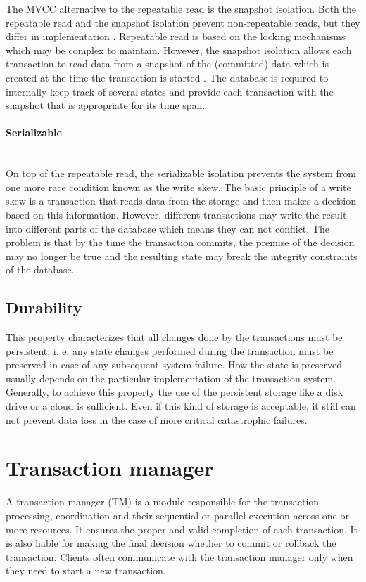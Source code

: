 \documentclass[oneside,
  digital, %
  table,   %
  nolof,     %
  nolot,     %
]{fithesis3}
\newcommand{\newlinepar}[1]{\paragraph{#1}\needspace{4\baselineskip}\mbox{}\\}
\begin{document}
The MVCC alternative to the repeatable read is the snapshot isolation. Both the repeatable read and the snapshot isolation prevent non-repeatable reads, but they differ in implementation \cite{isolation_levels}. Repeatable read is based on the locking mechanisms which may be complex to maintain. However, the snapshot isolation allows each transaction to read data from a snapshot of the (committed) data which is created at the time the transaction is started \cite{ansi-sql-critique}. The database is required to internally keep track of several states and provide each transaction with the snapshot that is appropriate for its time span.

\newlinepar{Serializable}

On top of the repeatable read, the serializable isolation prevents the system from one more race condition known as the write skew. The basic principle of a write skew is a transaction that reads data from the storage and then makes a decision based on this information. However, different transactions may write the result into different parts of the database which means they can not conflict. The problem is that by the time the transaction commits, the premise of the decision may no longer be true and the resulting state may break the integrity constraints of the database.

\subsection{Durability}

This property characterizes that all changes done by the transactions must be persistent, i. e. any state changes performed during the transaction must be preserved in case of any subsequent system failure. How the state is preserved usually depends on the particular implementation of the transaction system. Generally, to achieve this property the use of the persistent storage like a disk drive or a cloud is sufficient. Even if this kind of storage is acceptable, it still can not prevent data loss in the case of more critical catastrophic failures.


\section{Transaction manager}
\label{sec:transaction-manager}

A transaction manager (TM) is a module responsible for the transaction processing, coordination and their sequential or parallel execution across one or more resources. It ensures the proper and valid completion of each transaction. It is also liable for making the final decision whether to commit or rollback the transaction. Clients often communicate with the transaction manager only when they need to start a new transaction.
\end{document}
